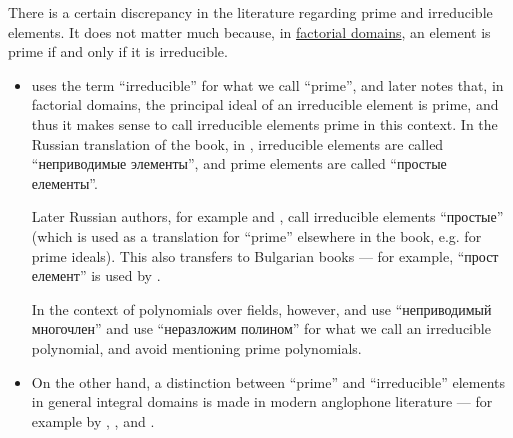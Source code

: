 \begin{remark}\label{rem:prime_and_irreducible_terminology}
  There is a certain discrepancy in the literature regarding prime and irreducible elements. It does not matter much because, in \hyperref[def:factorial_domain]{factorial domains}, an element is prime if and only if it is irreducible.

  \begin{itemize}
    \item {} uses the term \enquote{irreducible} for what we call \enquote{prime}, and later notes that, in factorial domains, the principal ideal of an irreducible element is prime, and thus it makes sense to call irreducible elements prime in this context. In the Russian translation of the book, in \cite[89]{Ленг1968Алгебра}, irreducible elements are called \enquote{неприводимые элементы}, and prime elements are called \enquote{простые елементы}.

    Later Russian authors, for example  and , call irreducible elements \enquote{простые} (which is used as a translation for \enquote{prime} elsewhere in the book, e.g. for prime ideals). This also transfers to Bulgarian books --- for example, \enquote{прост елемент} is used by .

    In the context of polynomials over fields, however,  and  use \enquote{неприводимый многочлен} and  use \enquote{неразложим полином} for what we call an irreducible polynomial, and avoid mentioning prime polynomials.

    \item On the other hand, a distinction between \enquote{prime} and \enquote{irreducible} elements in general integral domains is made in modern anglophone literature --- for example by , ,  and .
  \end{itemize}
\end{remark}

